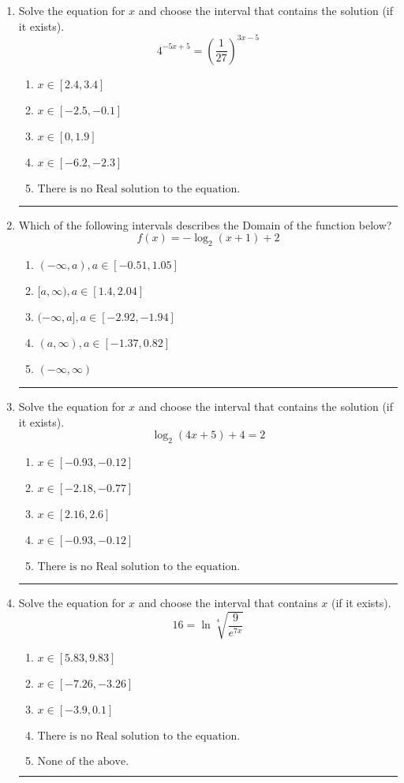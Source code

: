\documentclass[14pt]{extbook}
\newcommand{\litem}[1]{\item#1\hspace*{-1cm}\rule{\textwidth}{0.4pt}}
\begin{document}
\begin{enumerate}
{\begin{enumerate}[label=\Alph*.]
\end{enumerate} }
\litem{
Solve the equation for $x$ and choose the interval that contains the solution (if it exists).\[ 4^{-5x+5} = \left(\frac{1}{27}\right)^{3x-5} \]\begin{enumerate}[label=\Alph*.]
\item \( x \in [2.4, 3.4] \)
\item \( x \in [-2.5, -0.1] \)
\item \( x \in [0, 1.9] \)
\item \( x \in [-6.2, -2.3] \)
\item \( \text{There is no Real solution to the equation.} \)

\end{enumerate} }
\litem{
Which of the following intervals describes the Domain of the function below?\[ f(x) = -\log_2{(x+1)}+2 \]\begin{enumerate}[label=\Alph*.]
\item \( (-\infty, a), a \in [-0.51, 1.05] \)
\item \( [a, \infty), a \in [1.4, 2.04] \)
\item \( (-\infty, a], a \in [-2.92, -1.94] \)
\item \( (a, \infty), a \in [-1.37, 0.82] \)
\item \( (-\infty, \infty) \)

\end{enumerate} }
\litem{
Solve the equation for $x$ and choose the interval that contains the solution (if it exists).\[ \log_{2}{(4x+5)}+4 = 2 \]\begin{enumerate}[label=\Alph*.]
\item \( x \in [-0.93, -0.12] \)
\item \( x \in [-2.18, -0.77] \)
\item \( x \in [2.16, 2.6] \)
\item \( x \in [-0.93, -0.12] \)
\item \( \text{There is no Real solution to the equation.} \)

\end{enumerate} }
\litem{
 Solve the equation for $x$ and choose the interval that contains $x$ (if it exists).\[  16 = \ln{\sqrt[4]{\frac{9}{e^{7x}}}} \]\begin{enumerate}[label=\Alph*.]
\item \( x \in [5.83, 9.83] \)
\item \( x \in [-7.26, -3.26] \)
\item \( x \in [-3.9, 0.1] \)
\item \( \text{There is no Real solution to the equation.} \)
\item \( \text{None of the above.} \)


\end{enumerate}}
\end{enumerate}
\end{document}
